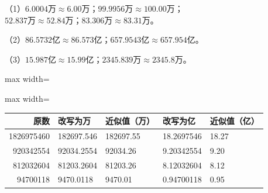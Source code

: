 
\begingroup\color{answerred}\par\endgroup
{}
\begingroup\color{answerred}\noindent（1）$6.0004$万$\approx6.00$万；$99.9956$万$\approx100.00$万；\\\hspace*{2em}$52.837$万$\approx52.84$万；$83.306$万$\approx83.31$万。\par
\noindent（2）$86.5732$亿$\approx86.573$亿；$657.9543$亿$\approx657.954$亿。\par
\noindent（3）$15.987$亿$\approx15.99$亿；$2345.839$万$\approx2345.8$万。\par\par\endgroup
{}
\begingroup\color{answerred}\noindent\begin{adjustbox}{max width=\linewidth}\begin{adjustbox}{max width=\linewidth}\begin{tabular}{rllll}\toprule
原数&改写为万&近似值（万）&改写为亿&近似值（亿）\\\midrule
1826975460&182697.546&182697.55&18.2697546&18.27\\
920342554&92034.2554&92034.26&9.20342554&9.20\\
812032604&81203.2604&81203.26&8.12032604&8.12\\
94700118&9470.0118&9470.01&0.94700118&0.95\\\bottomrule
\end{tabular}\end{adjustbox}\end{adjustbox}\par\endgroup
